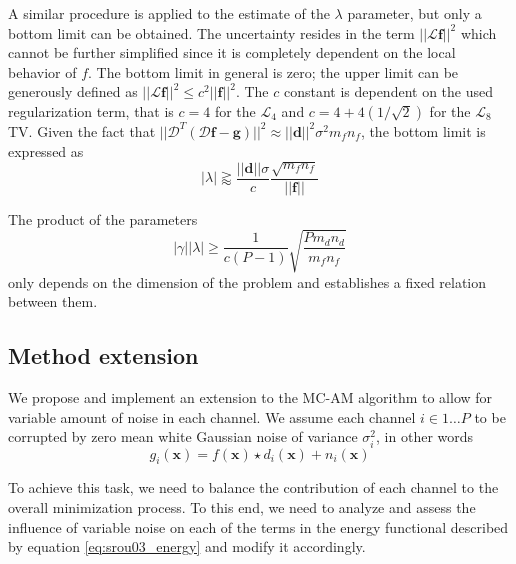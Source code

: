 \documentclass[12pt,notitlepage]{report}
\begin{document}
A similar procedure is applied to the estimate of the $\lambda$ parameter, but only a bottom limit can be obtained. The uncertainty resides in the term $||\mathcal{L} \mathbf{f}||^2$ which cannot be further simplified since it is completely dependent on the local behavior of $f$. The bottom limit in general is zero; the upper limit can be generously defined as $||\mathcal{L} \mathbf{f}||^2 \leq c^2 ||\mathbf{f}||^2$. The $c$ constant is dependent on the used regularization term, that is $c = 4$ for the $\mathcal{L}_4$ and $c = 4 + 4(1/\sqrt{2})$ for the $\mathcal{L}_8$ TV. Given the fact that $||\mathcal{D}^T (\mathcal{D} \mathbf{f} - \mathbf{g}) ||^2 \approx || \mathbf{d} ||^2 \sigma^2 m_f n_f$, the bottom limit is expressed as
\begin{equation}
\label{eq:srou03_lambda_estimate}
	|\lambda| \gtrapprox \frac{||\mathbf{d}||\sigma}{c} \frac{\sqrt{m_f n_f}}{||\mathbf{f}||}
\end{equation}

The product of the parameters 
\begin{equation}
\label{eq:srou03_lambda_estimate}
	|\gamma| |\lambda| \geq \frac{1}{c(P-1)} \sqrt{\frac{P m_d n_d}{m_f n_f}}
\end{equation}
only depends on the dimension of the problem and establishes a fixed relation between them.


\subsection{Method extension}
\label{sec:srou03_extension}
We propose and implement an extension to the MC-AM algorithm to allow for variable amount of noise in each channel. We assume each channel $i \in {1 \dots P}$ to be corrupted by zero mean white Gaussian noise of variance $\sigma_i^2$, in other words
\begin{equation}
\label{eq:srou03_general_model_ext}
	g_i(\mathbf{x}) = f(\mathbf{x}) \star d_i(\mathbf{x}) + n_i(\mathbf{x}) 	
\end{equation}

To achieve this task, we need to balance the contribution of each channel to the overall minimization process. To this end, we need to analyze and assess the influence of variable noise on each of the terms in the energy functional described by equation \ref{eq:srou03_energy} and modify it accordingly. 
\end{document}

